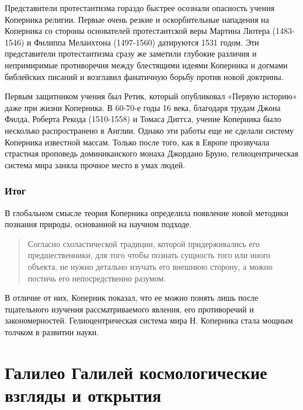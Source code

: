 \documentclass[
]{article}
\begin{document}
Представители протестантизма гораздо быстрее осознали опасность учения
Коперника религии. Первые очень резкие и оскорбительные нападения на
Коперника со стороны основателей протестантской веры Мартина Лютера
(1483-1546) и Филиппа Меланхтона (1497-1560) датируются 1531 годом. Эти
представители протестантизма сразу же заметили глубокие различия и
непримиримые противоречия между блестящими идеями Коперника и догмами
библейских писаний и возглавил фанатичную борьбу против новой доктрины.

Первым защитником учения был Ретик, который опубликовал «Первую историю»
даже при жизни Коперника. В 60-70-е годы 16 века, благодаря трудам Джона
Филда, Роберта Рекода (1510-1558) и Томаса Диггса, учение Коперника было
несколько распространено в Англии. Однако эти работы еще не сделали
систему Коперника известной массам. Только после того, как в Европе
прозвучала страстная проповедь доминиканского монаха Джордано Бруно,
гелиоцентрическая система мира заняла прочное место в умах людей.

\hypertarget{ux438ux442ux43eux433-5}{%
\subsubsection{Итог}\label{ux438ux442ux43eux433-5}}

В глобальном смысле теория Коперника определила появление новой методики
познания природы, основанной на научном подходе.

\begin{quote}
Согласно схоластической традиции, которой придерживались его
предшественники, для того чтобы познать сущность того или иного объекта,
не нужно детально изучать его внешнюю сторону, а можно постичь его
непосредственно разумом.
\end{quote}

В отличие от них, Коперник показал, что ее можно понять лишь после
тщательного изучения рассматриваемого явления, его противоречий и
закономерностей. Гелиоцентрическая система мира Н. Коперника стала
мощным толчком в развитии науки.

\hypertarget{ux433ux430ux43bux438ux43bux435ux43e-ux433ux430ux43bux438ux43bux435ux439-ux43aux43eux441ux43cux43eux43bux43eux433ux438ux447ux435ux441ux43aux438ux435-ux432ux437ux433ux43bux44fux434ux44b-ux438-ux43eux442ux43aux440ux44bux442ux438ux44f}{%
\section{Галилео Галилей космологические взгляды и
открытия}\label{ux433ux430ux43bux438ux43bux435ux43e-ux433ux430ux43bux438ux43bux435ux439-ux43aux43eux441ux43cux43eux43bux43eux433ux438ux447ux435ux441ux43aux438ux435-ux432ux437ux433ux43bux44fux434ux44b-ux438-ux43eux442ux43aux440ux44bux442ux438ux44f}}
\end{document}
